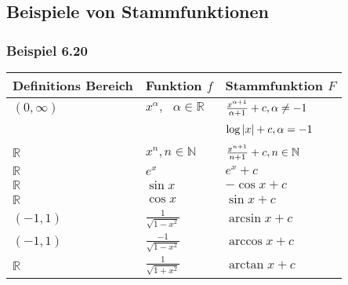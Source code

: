 \subsection*{Beispiele von Stammfunktionen}


\subsubsection*{Beispiel 6.20}
\renewcommand{\arraystretch}{1.8}
\begin{tabularx}{\textwidth}{|Y|Y|Y|}
\hline
    Definitions Bereich & Funktion $f$                          & Stammfunktion $F$                                                      \\\hline\hline
    $(0,\infty)$        & $x^\alpha,\text{ }\alpha\in\mathbb{R}$ & $\frac{{{x^{\alpha  + 1}}}}{{\alpha  + 1}} + c,{\rm{ }}\alpha  \ne  - 1$ \\ [1.5ex]
    ~                   & ~                                     & $\log \left| x \right| + c,{\rm{ }}\alpha  =  - 1$                       \\[1.5ex]\hline
    $\mathbb{R}$        & $x^n, n\in\mathbb{N}$                 & $\frac{{{x^{n + 1}}}}{{n + 1}} + c,{\rm{ }}n \in \mathbb{N}$             \\[1.5ex]\hline
    $\mathbb{R}$        & ${e^x}$                             & ${e^x}+c$                                                                \\ [1.5ex]\hline
    $\mathbb{R}$        & $\sin{x}$                             & $-\cos{x}+c$                                                                \\ [1.5ex]\hline
$\mathbb{R}$        & $\cos{x}$                             & $\sin{x}+c$                                                                \\ [1.5ex]\hline
$(-1,1)$        & $\frac{1}{\sqrt{1-x^2}}$                             & $\arcsin{x}+c$                                                                \\ [1.5ex]\hline
$(-1,1)$        & $\frac{-1}{\sqrt{1-x^2}}$                             & $\arccos{x}+c$                                                                \\ [1.5ex]\hline
$\mathbb{R}$        & $\frac{1}{\sqrt{1+x^2}}$                             & $\arctan{x}+c$                                                                \\ [1.5ex]\hline

\end{tabularx}
